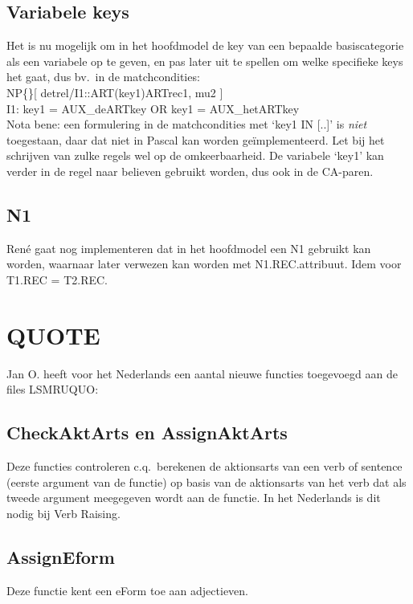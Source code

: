 \subsection{Variabele keys}
Het is nu mogelijk om in het hoofdmodel de key van een bepaalde basiscategorie 
als een variabele op te geven, en pas later uit te spellen om 
welke specifieke keys het gaat, dus bv.\ in de matchcondities:\\
NP\{\}[ detrel/I1::ART(key1){ARTrec1}, mu2 ]\\
I1: key1 = AUX\_deARTkey OR key1 = AUX\_hetARTkey\\
Nota bene: een formulering in de matchcondities met `key1 IN [..]' is {\em niet
\/} toegestaan, daar dat niet in Pascal kan worden ge\"{i}mplementeerd. Let bij 
het schrijven van zulke regels wel op de omkeerbaarheid. De variabele `key1' 
kan verder in de regel naar believen gebruikt worden, dus ook in de CA-paren.

\subsection{N1}
Ren\'{e} gaat nog implementeren dat in het hoofdmodel een N1 gebruikt kan 
worden, waarnaar later verwezen kan worden met N1.REC.attribuut. Idem voor 
T1.REC = T2.REC.

\section{QUOTE}
Jan O. heeft voor het Nederlands een aantal nieuwe functies toegevoegd aan de 
files LSMRUQUO: 
\subsection{CheckAktArts en AssignAktArts}
Deze functies controleren c.q.\ berekenen de aktionsarts van een verb of 
sentence (eerste argument van de functie) op basis van de aktionsarts van het 
verb dat als tweede argument 
meegegeven wordt aan de functie. In het Nederlands is 
dit nodig bij Verb Raising.

\subsection{AssignEform}
Deze functie kent een eForm toe aan adjectieven.


